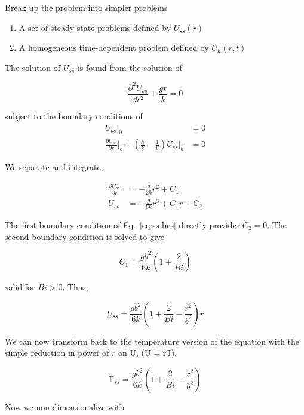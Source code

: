 Break up the problem into simpler problems

\begin{enumerate}
\item A set of steady-state problems defined by $U_{ss}(r)$
\item A homogeneous time-dependent problem defined by $U_h(r,t)$
\end{enumerate}

The solution of $U_{ss}$ is found from the solution of

\begin{equation}
    \frac{\partial^2 U_{ss}}{\partial r^2} + \frac{gr}{k} = 0
\end{equation}

subject to the boundary conditions of
\begin{align}\label{eq:ss-bcs}
    U_{ss}\big|_0 &= 0\\
    \frac{\partial U_{ss}}{\partial r}\big|_b + \left(\frac{h}{k} - \frac{1}{b}\right)U_{ss}\big|_b &= 0
\end{align}

We separate and integrate, 

\begin{align}
    \frac{\partial U_{ss}}{\partial r} & = -\frac{g}{2k} r^2 + C_1\\
    U_{ss} & = -\frac{g}{6k} r^3 + C_1r + C_2
\end{align}

The first boundary condition of Eq.~\ref{eq:ss-bcs} directly provides $C_2 = 0$. The second boundary condition is solved to give

\begin{equation}
    C_1 = \frac{gb^2}{6k}\left(1 + \frac{2}{Bi}\right)
\end{equation}

valid for $Bi > 0$. Thus,

\begin{equation}
    U_{ss} = \frac{gb^2}{6k}\left(1 + \frac{2}{Bi}-\frac{r^2}{b^2}\right)r
\end{equation}

We can now transform back to the temperature version of the equation with the simple reduction in power of $r$ on U, (U = r$\mathbb{T}$),

\begin{equation}
    \mathbb{T}_{ss} = \frac{gb^2}{6k}\left(1 + \frac{2}{Bi}-\frac{r^2}{b^2}\right) 
\end{equation}

Now we non-dimensionalize with 

